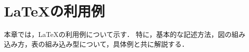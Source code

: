 \documentclass[a4paper,11pt,oneside,openany]{jsbook}
\begin{document}
\chapter{\LaTeX の利用例}
本章では，\LaTeX の利用例について示す．
特に，基本的な記述方法，図の組み込み方，表の組み込み型について，具体例と共に解説する．






%
\end{document}
